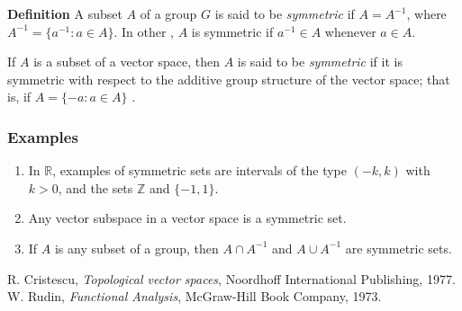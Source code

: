 \documentclass[12pt]{article}
\newcommand{\sR}[0]{\mathbb{R}}
\begin{document}
{\bf Definition} A subset $A$ of a group $G$ is said to be \emph{symmetric} if $A = A^{-1}$, where $A^{-1} = \{ a^{-1} : a \in A\}$. In other , $A$ is symmetric if $a^{-1}\in A$ whenever $a\in A$.

If $A$ is a subset of a vector space, then $A$ is said to be \emph{symmetric} if it is symmetric with respect to the additive group structure of the vector space; that is, if $A=\{-a: a\in A\}$ \cite{cristescu}.

\subsubsection{Examples}
\begin{enumerate}
\item In $\sR$, examples of symmetric sets are
intervals of the type $(-k,k)$ with $k>0$, and the sets $\mathbb{Z}$ and $\{-1,1\}$.
\item Any vector subspace in a vector space is a symmetric set.
\item If $A$ is any subset of a group, then $A\cap A^{-1}$ 
and $A\cup A^{-1}$ are symmetric sets. 
\end{enumerate}

\begin{thebibliography}{9}
  R. Cristescu, \emph{Topological vector spaces},
 Noordhoff International Publishing, 1977.
 W. Rudin, \emph{Functional Analysis},
 McGraw-Hill Book Company, 1973.
 \end{thebibliography}
\end{document}
